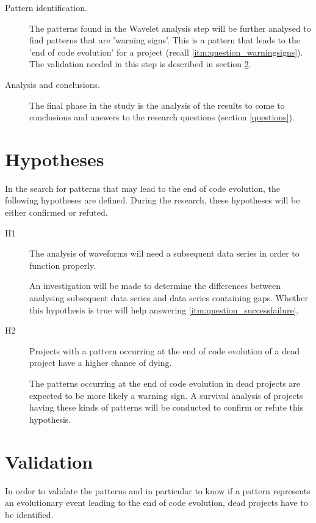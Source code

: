 \begin{description}
	\item[Pattern identification.] The patterns found in the Wavelet analysis step
	will be further analysed to find patterns that are 'warning signs'. This is a
	pattern that leads to the 'end of code evolution' for a project (recall
	\ref{itm:question_warningsigns}). The validation needed in this step is
	described in section \ref{method:validation}.
	
	\item[Analysis and conclusions.] The final phase in the study is the analysis
	of the results to come to conclusions and answers to the research questions
	(section \ref{questions}).
\end{description}

\section{Hypotheses}
In the search for patterns that may lead to the end of code evolution, the
following hypotheses are defined. During the research, these hypotheses will be
either confirmed or refuted.

\begin{description}
	\item[H1\label{hyp:subsequent_data}] \hspace{0em}
	The analysis of waveforms will need a subsequent data series in order
	to function properly.

	An investigation will be made to determine the differences between analysing
	subsequent data series and data series containing gaps. Whether this
	hypothesis is true will help answering \ref{itm:question_successfailure}.
	
	\item[H2\label{hyp:pattern_types}] \hspace{0em}
	Projects with a pattern occurring at the end of code evolution of a dead
	project have a higher chance of dying.

	The patterns occurring at the end of code evolution in dead projects are
	expected to be more likely a warning sign. A survival analysis of projects
	having these kinds of patterns will be conducted to confirm or refute this
	hypothesis.
\end{description}

\section{Validation}
\label{method:validation}
In order to validate the patterns and in particular to know if a pattern
represents an evolutionary event leading to the end of code evolution, dead
projects have to be identified.

